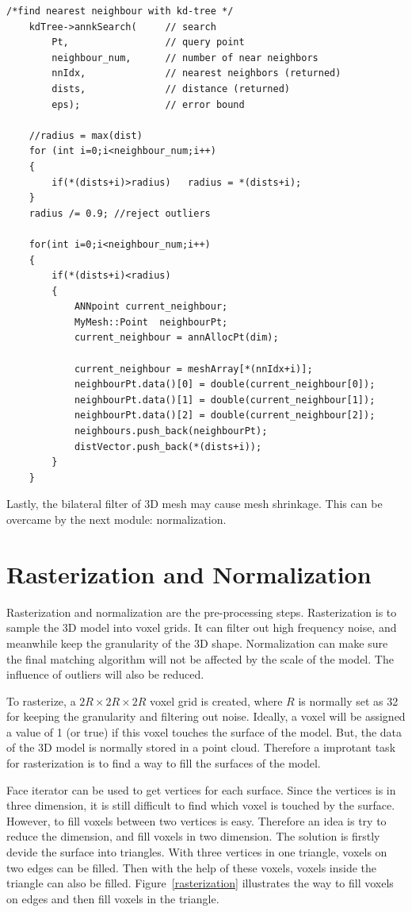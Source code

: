 \begin{lstlisting}[xleftmargin=1em]
/*find nearest neighbour with kd-tree */
	kdTree->annkSearch(		// search
		Pt,					// query point
		neighbour_num,      // number of near neighbors
		nnIdx,				// nearest neighbors (returned)
		dists,				// distance (returned)
		eps);				// error bound

	//radius = max(dist)
	for (int i=0;i<neighbour_num;i++)
	{
		if(*(dists+i)>radius)	radius = *(dists+i); 
	}
	radius /= 0.9; //reject outliers

	for(int i=0;i<neighbour_num;i++)
	{
		if(*(dists+i)<radius)
		{
			ANNpoint current_neighbour;
			MyMesh::Point  neighbourPt;
			current_neighbour = annAllocPt(dim);

			current_neighbour = meshArray[*(nnIdx+i)];
			neighbourPt.data()[0] = double(current_neighbour[0]);
			neighbourPt.data()[1] = double(current_neighbour[1]);
			neighbourPt.data()[2] = double(current_neighbour[2]);
			neighbours.push_back(neighbourPt);
			distVector.push_back(*(dists+i));
		}
	}
\end{lstlisting}

Lastly, the bilateral filter of 3D mesh may cause mesh shrinkage. This can be overcame by the next module: normalization. 

\section{Rasterization and Normalization}

Rasterization and normalization are the pre-processing steps. Rasterization is to sample the 3D model into voxel grids. It can filter out high frequency noise, and meanwhile keep the granularity of the 3D shape. Normalization can make sure the final matching algorithm will not be affected by the scale of the model. The influence of outliers will also be reduced. 

To rasterize, a $2R\times2R\times2R$ voxel grid is created, where $R$ is normally set as 32 for keeping the granularity and filtering out noise. Ideally, a voxel will be assigned a value of 1 (or true) if this voxel touches the surface of the model. But, the data of the 3D model is normally stored in a point cloud. Therefore a improtant task for rasterization is to find a way to fill the surfaces of the model. 

Face iterator can be used to get vertices for each surface. Since the vertices is in three dimension, it is still difficult to find which voxel is touched by the surface. However, to fill voxels between two vertices is easy. Therefore an idea is try to reduce the dimension, and fill voxels in two dimension. The solution is firstly devide the surface into triangles. With three vertices in one triangle, voxels on two edges can be filled. Then with the help of these voxels, voxels inside the triangle can also be filled. Figure~\ref{rasterization} illustrates the way to fill voxels on edges and then fill voxels in the triangle.

